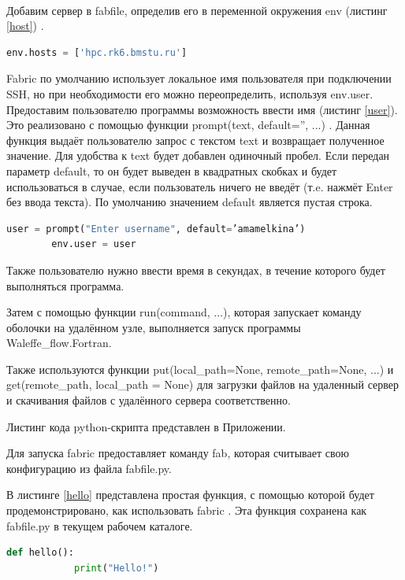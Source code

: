 \ 

Добавим сервер в fabfile, определив его в переменной окружения env (листинг \ref{host}) \cite{fabric-env}. 
\begin{lstlisting}[label=host, language=Python, caption=Добавление сервера в переменную окружения env] 
        env.hosts = ['hpc.rk6.bmstu.ru']  \end{lstlisting}
 
Fabric по умолчанию использует локальное имя пользователя при подключении SSH, но при необходимости его можно переопределить, используя env.user. Предоставим пользователю программы возможность ввести имя (листинг \ref{user}). Это реализовано с помощью функции prompt(text, default='', ...) \cite{fabric-func}.
Данная функция выдаёт пользователю запрос с текстом text и возвращает полученное значение. Для удобства к text будет добавлен одиночный пробел.
Если передан параметр default, то он будет выведен в квадратных скобках и будет использоваться в случае, если пользователь ничего не введёт (т.e. нажмёт Enter без ввода текста). По умолчанию значением default является пустая строка.
\begin{lstlisting}[label=user, language=Python, caption=Добавление имени пользователя в переменную окружения env] 
        user = prompt("Enter username", default=’amamelkina’)
        env.user = user \end{lstlisting}
        
Также пользователю нужно ввести время в секундах, в течение которого будет выполняться программа.

Затем с помощью функции run(command, ...), которая запускает команду оболочки на удалённом узле, выполняется запуск программы Waleffe\_flow.Fortran.

Также используются функции put(local\_path=None, remote\_path=None, ...) и get(remote\_path, local\_path = None) для загрузки файлов на удаленный сервер и скачивания файлов с удалённого сервера соответственно.

Листинг кода python-скрипта представлен в Приложении.

Для запуска fabric предоставляет команду fab, которая считывает свою конфигурацию из файла fabfile.py.

В листинге \ref{hello} представлена простая функция, с помощью которой будет продемонстрировано, как использовать fabric \cite{fabric-hello}. Эта функция сохранена как fabfile.py в текущем рабочем каталоге.
\begin{lstlisting}[label=hello, language=Python, caption=Пример функции]
        def hello():
            print("Hello!") \end{lstlisting}


